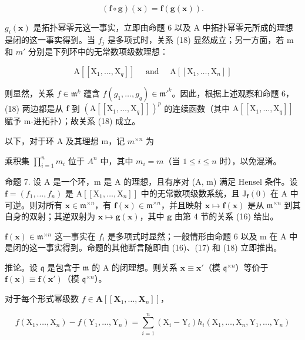 \[
(\mathbf {f} \circ \mathbf {g}) (\mathbf {x}) = \mathbf {f} (\mathbf {g} (\mathbf {x})).\tag{18}
\]

\(g_{i}(\mathbf{x})\) 是拓扑幂零元这一事实，立即由命题 6 以及 A 中拓扑幂零元所成的理想是闭的这一事实得到。当 \(f_{j}\) 是多项式时，关系 (18) 显然成立；另一方面，若 m 和 \(m'\) 分别是下列环中的无常数项级数理想：

\[
\mathrm{A} \left[ \left[ \mathrm{X} _ {1}, \dots , \mathrm{X} _ {q} \right] \right] \quad \text { and } \quad \mathrm{A} \left[ \left[ \mathrm{X} _ {1}, \dots , \mathrm{X} _ {n} \right] \right]
\]

则显然，关系 \(f \in \mathfrak{m}^k\) 蕴含 \(f(g_1, \ldots, g_q) \in \mathfrak{m}'^k\)。因此，根据上述观察和命题 6，(18) 两边都是从 \(\mathbf{f}\) 到 \((\mathrm{A}[[\mathrm{X}_1, \ldots, \mathrm{X}_q]])^p\) 的连续函数（其中 \(\mathrm{A}[[\mathrm{X}_1, \ldots, \mathrm{X}_q]]\) 赋予 m-进拓扑）；故关系 (18) 成立。

以下，对于环 A 及其理想 m，记 \(m^{\times n}\) 为

乘积集 \(\prod_{i=1}^{n} m_i\) 位于 \(A^n\) 中，其中 \(m_i = m\)（当 \(1 \leqslant i \leqslant n\) 时），以免混淆。

命题 7. 设 A 是一个环，m 是 A 的理想，且有序对 (A, m) 满足 Hensel 条件。设 \(\mathbf{f} = (f_1, \ldots, f_n)\) 是 \(\mathrm{A}[[\mathrm{X}_1, \ldots, \mathrm{X}_n]]\) 中的无常数项级数系统，且 \(\mathrm{J}_{\mathbf{f}}(0)\) 在 A 中可逆。则对所有 \(\mathbf{x} \in \mathfrak{m}^{\times n}\)，有 \(\mathbf{f}(\mathbf{x}) \in \mathfrak{m}^{\times n}\)，并且映射 \(\mathbf{x} \mapsto \mathbf{f}(\mathbf{x})\) 是从 \(\mathfrak{m}^{\times n}\) 到其自身的双射；其逆双射为 \(\mathbf{x} \mapsto \mathbf{g}(\mathbf{x})\)，其中 \(\mathbf{g}\) 由第 4 节的关系 (16) 给出。

\(\mathbf{f}(\mathbf{x})\in\mathfrak{m}^{\times n}\) 这一事实在 \(f_{i}\) 是多项式时显然；一般情形由命题 6 以及 m 在 A 中是闭的这一事实得到。命题的其他断言随即由 (16)、(17) 和 (18) 立即推出。

推论。设 \(\mathfrak{q}\) 是包含于 \(\mathfrak{m}\) 的 A 的闭理想。则关系 \(\mathbf{x} \equiv \mathbf{x}'\)（模 \(\mathfrak{q}^{\times n}\)）等价于 \(\mathbf{f}(\mathbf{x}) \equiv \mathbf{f}(\mathbf{x}')\)（模 \(\mathfrak{q}^{\times n}\)）。

对于每个形式幂级数 \(f \in \mathbf{A}[[\mathbf{X}_1, \ldots, \mathbf{X}_n]]\)，

\[
f \left(\mathrm{X} _ {1}, \dots , \mathrm{X} _ {n}\right) - f \left(\mathrm{Y} _ {1}, \dots , \mathrm{Y} _ {n}\right) = \sum_ {i = 1} ^ {n} \left(\mathrm{X} _ {i} - \mathrm{Y} _ {i}\right) h _ {i} \left(\mathrm{X} _ {1}, \dots , \mathrm{X} _ {n}, \mathrm{Y} _ {1}, \dots , \mathrm{Y} _ {n}\right)
\]

